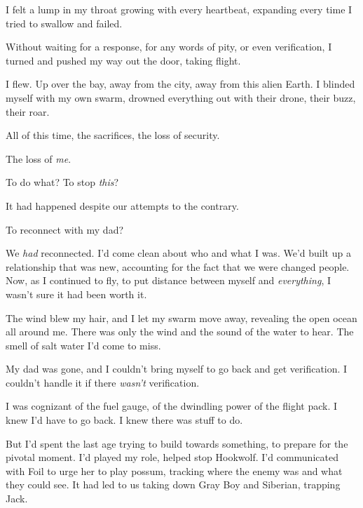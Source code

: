 I felt a lump in my throat growing with every heartbeat, expanding every time I tried to swallow and failed.



Without waiting for a response, for any words of pity, or even verification, I turned and pushed my way out the door, taking flight.



I flew.  Up over the bay, away from the city, away from this alien Earth.  I blinded myself with my own swarm, drowned everything out with their drone, their buzz, their roar.



All of this time, the sacrifices, the loss of security.



The loss of \emph{me}.



To do what?  To stop \emph{this}?



It had happened despite our attempts to the contrary.



To reconnect with my dad?



We \emph{had} reconnected.  I'd come clean about who and what I was.  We'd built up a relationship that was new, accounting for the fact that we were changed people.  Now, as I continued to fly, to put distance between myself and \emph{everything}, I wasn't sure it had been worth it.



The wind blew my hair, and I let my swarm move away, revealing the open ocean all around me.  There was only the wind and the sound of the water to hear.  The smell of salt water I'd come to miss.



My dad was gone, and I couldn't bring myself to go back and get verification.  I couldn't handle it if there \emph{wasn't} verification.



I was cognizant of the fuel gauge, of the dwindling power of the flight pack.  I knew I'd have to go back.  I knew there was stuff to do.



But I'd spent the last age trying to build towards something, to prepare for the pivotal moment.  I'd played my role, helped stop Hookwolf.  I'd communicated with Foil to urge her to play possum, tracking where the enemy was and what they could see.  It had led to us taking down Gray Boy and Siberian, trapping Jack.



